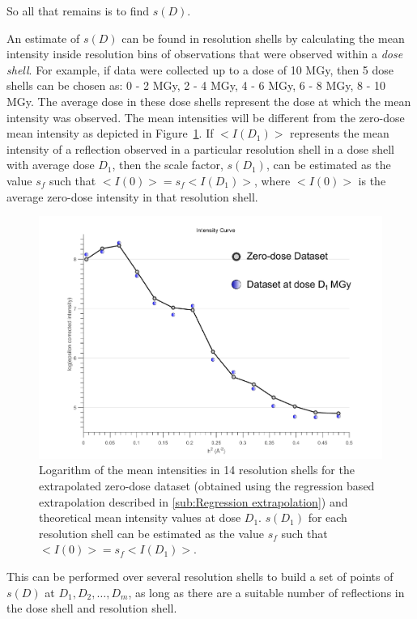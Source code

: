 So all that remains is to find $s(D)$.

An estimate of $s(D)$ can be found in resolution shells by calculating the mean intensity inside resolution bins of observations that were observed within a \textit{dose shell}.
For example, if data were collected up to a dose of 10 MGy, then 5 dose shells can be chosen as: 0 - 2 MGy, 2 - 4 MGy, 4 - 6 MGy, 6 - 8 MGy, 8 - 10 MGy.
The average dose in these dose shells represent the dose at which the mean intensity was observed.
The mean intensities will be different from the zero-dose mean intensity as depicted in Figure~\ref{fig:mean intensity in resolution shells, various doses - Extrapolation method}.
If $<I(D_1)>$ represents the mean intensity of a reflection observed in a particular resolution shell in a dose shell with average dose $D_1$, then the scale factor, $s(D_1)$, can be estimated as the value $s_f$ such that $<I(0)> = s_f <I(D_1)>$, where $<I(0)>$ is the average zero-dose intensity in that resolution shell.
\begin{figure}
  \centering
    \includegraphics[width=1\textwidth]{figures/zde/extrapolationscaling_scale_points.pdf}
    \caption{Logarithm of the mean intensities in 14 resolution shells for the extrapolated zero-dose dataset (obtained using the regression based extrapolation described in \ref{sub:Regression extrapolation}) and theoretical mean intensity values at dose $D_1$.
    $s(D_1)$ for each resolution shell can be estimated as the value $s_f$ such that $<I(0)> = s_f <I(D_1)>$.}
    \label{fig:mean intensity in resolution shells, various doses - Extrapolation method}
\end{figure}
This can be performed over several resolution shells to build a set of points of $s(D)$ at $D_1, D_2,\ldots, D_m$, as long as there are a suitable number of reflections in the dose shell and resolution shell.
